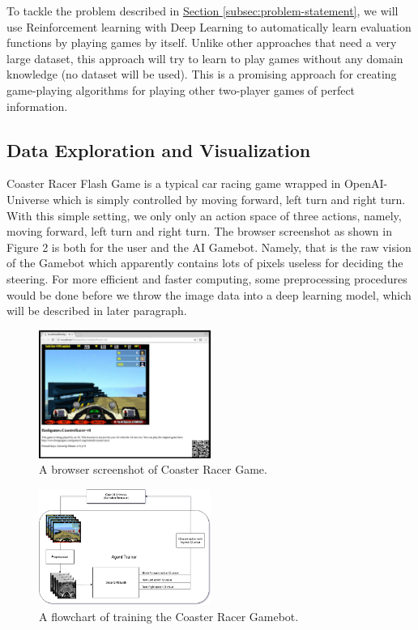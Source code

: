 \documentclass[a4paper]{article}
\begin{document}
To tackle the problem described in \hyperref[subsec:problem-statement]{Section \ref*{subsec:problem-statement}}, we will use Reinforcement learning with Deep Learning to automatically learn evaluation functions by playing games by itself. Unlike other approaches that need a very large dataset, this approach will try to learn to play games without any domain knowledge (no dataset will be used). This is a promising approach for creating game-playing algorithms for playing other two-player games of perfect information.

\subsection{Data Exploration and Visualization}

Coaster Racer Flash Game is a typical car racing game wrapped in OpenAI-Universe which is simply controlled by moving forward, left turn and right turn. With this simple setting, we only only an action space of three actions, namely, moving forward, left turn and right turn. The browser screenshot as shown in Figure 2 is both for the user and the AI Gamebot. Namely, that is the raw vision of the Gamebot which apparently contains lots of pixels useless for deciding the steering. For more efficient and faster computing, some preprocessing procedures would be done before we throw the image data into a deep learning model, which will be described in later paragraph.

\begin{figure}[h]
\centering
\includegraphics[width=0.5\textwidth]{raw-vision-of-game}
\caption{A browser screenshot of Coaster Racer Game.}
\end{figure}

\begin{figure}[h]
\centering
\includegraphics[width=0.5\textwidth]{implementation}
\caption{A flowchart of training the Coaster Racer Gamebot.}
\end{figure}
\end{document}
